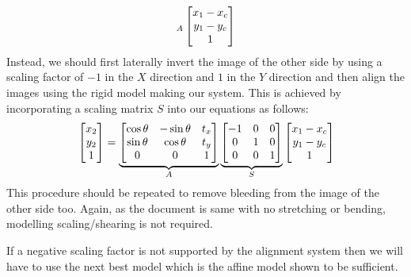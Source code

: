 \documentclass[a4paper]{article}
\begin{document}
\begin{enumerate}[label=(\alph*)]
\begin{equation}{\label{eq:rigid}}
{		}_{A}
		\begin{bmatrix}
			x_1-x_c\\y_1 - y_c\\1
		\end{bmatrix}
	\end{equation}
	Instead, we should first laterally invert the image of the other side by using a scaling factor of $-1$ in the $X$ direction and $1$ in the $Y$ direction and then align the images using the rigid model making our system. This is achieved by incorporating a scaling matrix $S$ into our equations as follows:
	\begin{equation}{\label{eq:rigidunequalscaling}}
		\begin{bmatrix}
			x_2\\y_2\\1
		\end{bmatrix}
		=
		\underbrace{
		\begin{bmatrix}
			\cos\theta & -\sin\theta & t_x\\
			\sin\theta & \cos\theta  & t_y\\
			0          & 0           & 1\\
		\end{bmatrix}
		}_{A}
		\underbrace{
		\begin{bmatrix}
			-1 & 0 & 0\\
			 0 & 1 & 0\\
			 0 & 0 & 1\\
		\end{bmatrix}
		}_{S}
		\begin{bmatrix}
			x_1-x_c\\y_1 - y_c\\1
		\end{bmatrix}
	\end{equation}
	This procedure should be repeated to remove bleeding from the image of the other side too. Again, as the document is same with no stretching or bending, modelling scaling/shearing is not required.

	If a negative scaling factor is not supported by the alignment system then we will have to use the next best model which is the affine model shown to be sufficient.
\end{enumerate}
\end{document}
